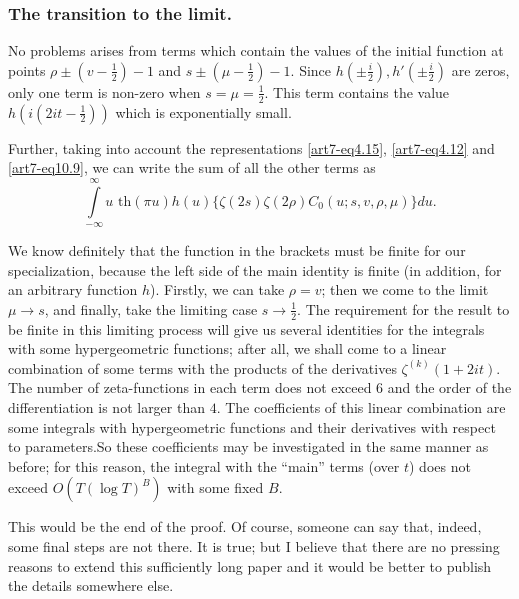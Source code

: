 \setcounter{section}{2}
\subsubsection{The transition to the limit.}\label{subsubsec2.9.2}
No problems arises from terms which contain the values of the initial function at points $\rho \pm (v - \frac{1}{2}) -1$ and $s\pm (\mu -\frac{1}{2}) -1$. Since $h (\pm \frac{i}{2}), h'(\pm \frac{i}{2})$ are zeros, only one term is non-zero when $s =\mu = \frac{1}{2}$. This term contains the value $h(i(2 it -\frac{1}{2}))$ which is exponentially small.

Further, taking into account the representations \eqref{art7-eq4.15}, \eqref{art7-eq4.12} and \eqref{art7-eq10.9}, we can write the sum of all the other terms as 
\setcounter{section}{10}
\begin{equation}
\int\limits^\infty_{-\infty} u \text{ th} (\pi u) h(u) \{\zeta (2s) \zeta(2 \rho) C_0 (u; s, v, \rho, \mu) \} du. \label{art7-eq10.13}
\end{equation}

We know definitely that the function in the brackets must be finite for our specialization, because the left side of the main identity is finite (in addition, for an arbitrary function $h$). Firstly, we can take $\rho = v$; then we come to the limit $\mu \to s$, and finally, take the limiting case $s \to \frac{1}{2}$. The requirement for the result to be finite in this limiting process will give us several identities for the integrals with some hypergeometric functions; after all, we shall come to a linear combination of some terms with the products of the derivatives $\zeta^{(k)} (1+ 2 it)$. The number of zeta-functions in each term does not exceed 6 and the order of the differentiation is not larger than $4$. The coefficients of this linear combination are some integrals with hypergeometric functions and their derivatives with respect to parameters.\pageoriginale So these coefficients may be investigated in the same manner as before; for this reason, the integral with the ``main'' terms (over $t$) does not exceed $O(T (\log T)^B)$ with some fixed $B$.

This would be the end of the proof. Of course, someone can say that, indeed, some final steps are not there. It is true; but I believe that there are no pressing reasons to extend this sufficiently long paper and it would be better to publish the details somewhere else. 

